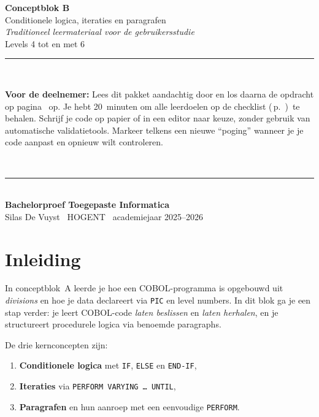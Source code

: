 \documentclass[11pt,a4paper]{article}
\begin{document}
\begin{titlepage}
\begin{center}
\vspace*{2cm}
{\Huge\bfseries Conceptblok B}\\[0.5cm]
{\Large Conditionele logica, iteraties en paragrafen}\\[2cm]

{\large \textit{Traditioneel leermateriaal voor de gebruikersstudie}}\\[0.3cm]
{\large Levels 4 tot en met 6}\\[3cm]

\rule{\textwidth}{0.4pt}\\[0.5cm]
\begin{minipage}{0.9\textwidth}
\textbf{Voor de deelnemer:}
Lees dit pakket aandachtig door en los daarna de opdracht op pagina~\pageref{sec:opdracht-B} op. 
Je hebt 20~minuten om alle leerdoelen op de checklist (\,p.~\pageref{sec:rubric-B})\, te behalen. 
Schrijf je code op papier of in een editor naar keuze, zonder gebruik van automatische validatietools. 
Markeer telkens een nieuwe ``poging'' wanneer je je code aanpast en opnieuw wilt controleren.
\end{minipage}\\
\rule{\textwidth}{0.4pt}\\[1cm]

\vfill
\textbf{Bachelorproef Toegepaste Informatica} \\
Silas De Vuyst \textbullet\ HOGENT \textbullet\ academiejaar 2025--2026
\end{center}
\end{titlepage}

\section{Inleiding}

In conceptblok~A leerde je hoe een COBOL-programma is opgebouwd uit \textit{divisions} en hoe je data declareert via \texttt{PIC} en level numbers. 
In dit blok ga je een stap verder: je leert COBOL-code \emph{laten beslissen} en \emph{laten herhalen}, en je structureert procedurele logica via benoemde paragraphs.

De drie kernconcepten zijn:

\begin{enumerate}[label=(\arabic*)]
    \item \textbf{Conditionele logica} met \texttt{IF}, \texttt{ELSE} en \texttt{END-IF},
    \item \textbf{Iteraties} via \texttt{PERFORM VARYING \ldots\ UNTIL},
    \item \textbf{Paragrafen} en hun aanroep met een eenvoudige \texttt{PERFORM}.
\end{enumerate}
\end{document}
